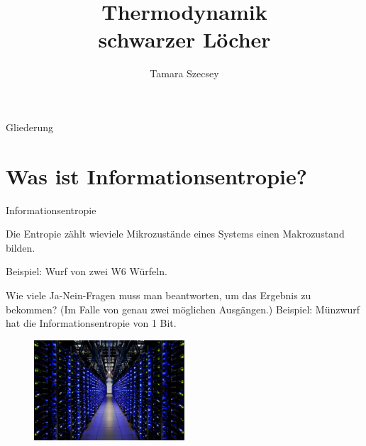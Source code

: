 \documentclass[ngerman,ph]{URbeamer}
\title{Thermodynamik \\schwarzer Löcher}
\institute{Fakultät für Physik}
\author{Tamara Szecsey}
\begin{document}
	\frame[plain]{\titlepage}
	
	\begin{frame}{Gliederung}
		\tableofcontents
	\end{frame}
	
	\section{Was ist Informationsentropie?}
	\begin{frame}{Informationsentropie}
		\begin{block}{}
			Die Entropie zählt wieviele Mikrozustände eines Systems einen Makrozustand bilden. 
			
			Beispiel: Wurf von zwei W6 Würfeln.
		\end{block}
		
		\begin{block}{}
		Wie viele Ja-Nein-Fragen muss man beantworten, um das Ergebnis zu bekommen?
		(Im Falle von genau zwei möglichen Ausgängen.)
		Beispiel: Münzwurf hat die Informationsentropie von 1 Bit.	
		\end{block}
		\begin{figure} [h] 
			\begin{center}
				\includegraphics[width=0.5\textwidth]{Server}
			\end{center}
		\end{figure} 	 	%
		\hfill
	\end{frame}
	
\end{document}
